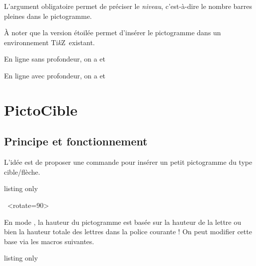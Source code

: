 \documentclass[french,11pt,a4paper]{article}
\providecommand\tikzlogo{Ti\textit{k}Z}
\let\TikZ\tikzlogo
\begin{document}
L'argument obligatoire permet de préciser le \textit{niveau}, c'est-à-dire le nombre barres pleines dans le pictogramme.

À noter que la version étoilée permet d'insérer le pictogramme dans un environnement \TikZ\ existant.

\begin{DemoCode}{}

\begin{LARGE}
En ligne sans profondeur, on a  et 
\end{LARGE}

\begin{Huge}
En ligne avec profondeur, on a  et 
\end{Huge}
\end{DemoCode}

\pagebreak

\section{PictoCible}

\subsection{Principe et fonctionnement}

L'idée est de proposer une commande pour insérer un petit pictogramme du type cible/flèche.

\begin{DemoCode}{listing only}
\end{DemoCode}

\begin{DemoCode}{}
\pictobullseye~\pictobullseye[height=auto]<rotate=90>
\end{DemoCode}

En mode , la hauteur du pictogramme est basée sur la hauteur de la lettre {\setlength\fboxsep{0.5pt}} ou bien la hauteur totale des lettres {\setlength\fboxsep{0.5pt}} dans la police courante ! On peut modifier cette base via les macros suivantes.

\begin{DemoCode}{listing only}
\def\calcheightofchars{H}
\def\calctotheightofchars{qH}
\def\calcdepthofchars{qH}
\end{DemoCode}
\end{document}
